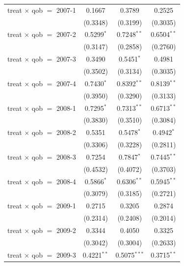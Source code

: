 \begin{table}[H]
\begin{tabular}{lccc}
      treat $\times$ qob $=$ 2007-1  & 0.1667        & 0.3789         & 0.2525\\   
                                     & (0.3348)      & (0.3199)       & (0.3035)\\   
      treat $\times$ qob $=$ 2007-2  & 0.5299$^{*}$  & 0.7248$^{**}$  & 0.6504$^{**}$\\   
                                     & (0.3147)      & (0.2858)       & (0.2760)\\   
      treat $\times$ qob $=$ 2007-3  & 0.3490        & 0.5451$^{*}$   & 0.4981\\   
                                     & (0.3502)      & (0.3134)       & (0.3035)\\   
      treat $\times$ qob $=$ 2007-4  & 0.7430$^{*}$  & 0.8392$^{**}$  & 0.8139$^{**}$\\   
                                     & (0.3950)      & (0.3290)       & (0.3133)\\   
      treat $\times$ qob $=$ 2008-1  & 0.7295$^{*}$  & 0.7313$^{**}$  & 0.6713$^{**}$\\   
                                     & (0.3830)      & (0.3510)       & (0.3084)\\   
      treat $\times$ qob $=$ 2008-2  & 0.5351        & 0.5478$^{*}$   & 0.4942$^{*}$\\   
                                     & (0.3306)      & (0.3228)       & (0.2811)\\   
      treat $\times$ qob $=$ 2008-3  & 0.7254        & 0.7847$^{*}$   & 0.7445$^{**}$\\   
                                     & (0.4532)      & (0.4072)       & (0.3703)\\   
      treat $\times$ qob $=$ 2008-4  & 0.5866$^{*}$  & 0.6306$^{**}$  & 0.5945$^{**}$\\   
                                     & (0.3079)      & (0.3185)       & (0.2721)\\   
      treat $\times$ qob $=$ 2009-1  & 0.2715        & 0.3205         & 0.2874\\   
                                     & (0.2314)      & (0.2408)       & (0.2014)\\   
      treat $\times$ qob $=$ 2009-2  & 0.3344        & 0.4050         & 0.3325\\   
                                     & (0.3042)      & (0.3004)       & (0.2633)\\   
      treat $\times$ qob $=$ 2009-3  & 0.4221$^{**}$ & 0.5075$^{***}$ & 0.3715$^{**}$\\   

\end{tabular}
\end{table}
